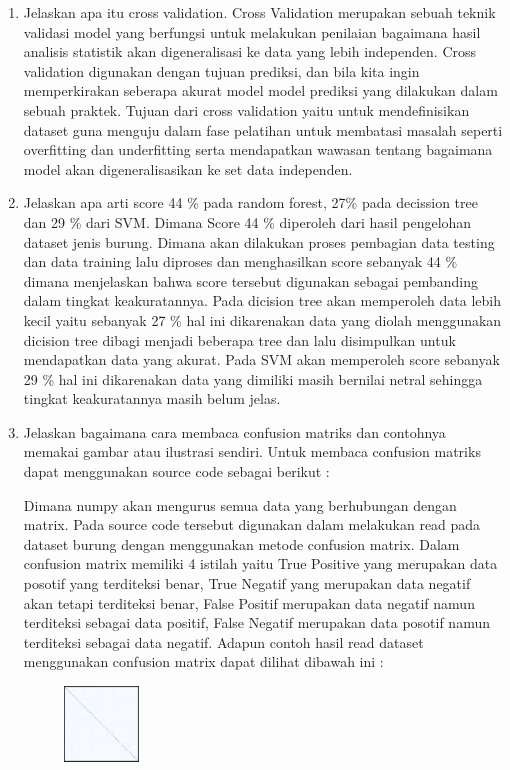 \begin{enumerate}
	\item Jelaskan apa itu cross validation.
	\hfill\break
	Cross Validation merupakan sebuah teknik validasi model yang berfungsi untuk melakukan penilaian bagaimana hasil analisis statistik akan digeneralisasi ke data yang lebih independen. Cross validation digunakan dengan tujuan prediksi, dan bila kita ingin memperkirakan seberapa akurat model model prediksi yang dilakukan dalam sebuah praktek. Tujuan dari cross validation yaitu untuk mendefinisikan dataset guna menguju dalam fase pelatihan untuk membatasi masalah seperti overfitting dan underfitting serta mendapatkan wawasan tentang bagaimana model akan digeneralisasikan ke set data independen.
	\item Jelaskan apa arti score 44 \% pada random forest, 27\% pada decission tree dan 29 \% dari SVM.
	\hfill\break
	Dimana Score 44 \% diperoleh dari hasil pengelohan dataset jenis burung. Dimana akan dilakukan proses pembagian data testing dan data training lalu diproses dan menghasilkan score sebanyak 44 \% dimana menjelaskan bahwa score tersebut digunakan sebagai pembanding dalam tingkat keakuratannya. Pada dicision tree akan memperoleh data lebih kecil yaitu sebanyak 27 \% hal ini dikarenakan data yang diolah menggunakan dicision tree dibagi menjadi beberapa tree dan lalu disimpulkan untuk mendapatkan data yang akurat. Pada SVM akan memperoleh score sebanyak 29 \% hal ini dikarenakan data yang dimiliki masih bernilai netral sehingga tingkat keakuratannya masih belum jelas.
	\item Jelaskan bagaimana cara membaca confusion matriks dan contohnya memakai gambar atau ilustrasi sendiri.
	\hfill\break
	Untuk membaca confusion matriks dapat menggunakan source code sebagai berikut :
	
	\hfill\break
	Dimana numpy akan mengurus semua data yang berhubungan dengan matrix. Pada source code tersebut digunakan dalam melakukan read pada dataset burung dengan menggunakan metode confusion matrix. Dalam confusion matrix memiliki 4 istilah yaitu True Positive yang merupakan data posotif yang terditeksi benar, True Negatif yang merupakan data negatif akan tetapi terditeksi benar, False Positif merupakan data negatif namun terditeksi sebagai data positif, False Negatif merupakan data posotif namun terditeksi sebagai data negatif. Adapun contoh hasil read dataset menggunakan confusion matrix dapat dilihat dibawah ini :
	\begin{figure}[H]
	\centering
		\includegraphics[width=2cm]{figures/1174027/3/2.png}

\end{figure}
\end{enumerate}
